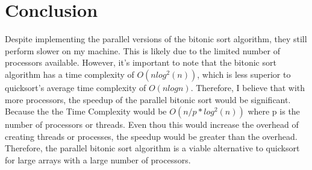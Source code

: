 \section{Conclusion}
Despite implementing the parallel versions of the bitonic sort algorithm, they still perform slower on my machine. This is likely due to the limited number of processors available. However, it's important to note that the bitonic sort algorithm has a time complexity of $O( n log^2( n))$, which is less superior to quicksort's average time complexity of $O(n log n)$. Therefore, I believe that with more processors, the speedup of the parallel bitonic sort would be significant. Because the the Time Complexity would be $O(n/p * log^2 (n))$
where p is the number of processors or threads. Even thou this would increase the overhead of creating threads or processes, the speedup would be greater than the overhead. Therefore, the parallel bitonic sort algorithm is a viable alternative to quicksort for large arrays with a large number of processors.  

